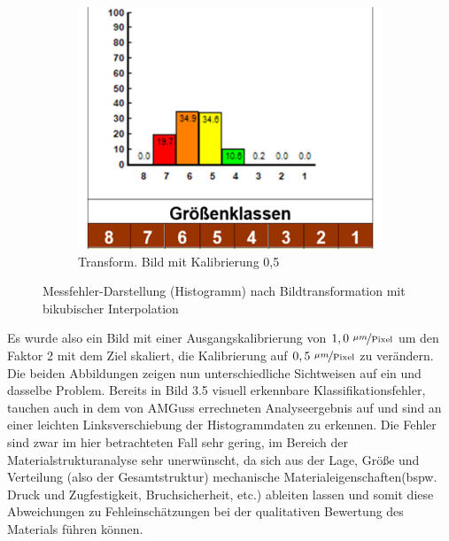 \documentclass[
fontsize=10pt, 
listof = totoc,
parskip = half	
]{report}
\begin{document}
\begin{figure}[h]
\begin{subfigure}{0.33\textwidth}
	\end{subfigure}\hfill
	\begin{subfigure}{0.33\textwidth}
		\centering
		\includegraphics[scale=0.5]{pics/HistoCalib05.png}
		\caption{Transform. Bild mit Kalibrierung 0,5}
	\end{subfigure}
	\caption{Messfehler-Darstellung (Histogramm) nach Bildtransformation mit bikubischer Interpolation}
	\label{fig:KlassErrorHisto}
\end{figure}

\newpage

\noindent Es wurde also ein Bild mit einer Ausgangskalibrierung von $1,0~\nicefrac{\mu m}{\text{Pixel}}$ um den Faktor 2 mit dem Ziel skaliert, die Kalibrierung auf $0,5~\nicefrac{\mu m}{\text{Pixel}}$ zu verändern. Die beiden Abbildungen zeigen nun unterschiedliche Sichtweisen auf ein und dasselbe Problem. Bereits in Bild 3.5 visuell erkennbare Klassifikationsfehler, tauchen auch in dem von AMGuss errechneten Analyseergebnis auf und sind an einer leichten Linksverschiebung der Histogrammdaten zu erkennen. Die Fehler sind zwar im hier betrachteten Fall sehr gering, im Bereich der Materialstrukturanalyse sehr unerwünscht, da sich aus der Lage, Größe und Verteilung (also der Gesamtstruktur) mechanische Materialeigenschaften(bspw. Druck und Zugfestigkeit, Bruchsicherheit, etc.) ableiten lassen und somit diese Abweichungen zu Fehleinschätzungen bei der qualitativen Bewertung des Materials führen können.
\end{document}
